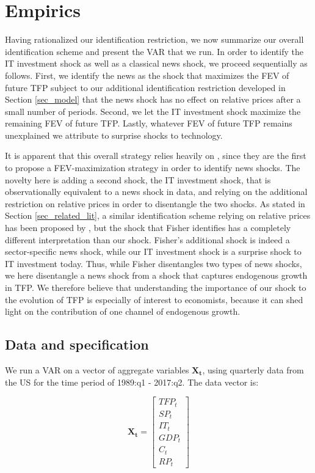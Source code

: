 \documentclass[11pt]{article}
\renewcommand{\[}{\begin{equation}}
\renewcommand{\]}{\end{equation}}
\begin{document}
\section{Empirics}
\label{sec_empirics}
Having rationalized our identification restriction, we now summarize our overall identification scheme and present the VAR that we run. In order to identify the IT investment shock as well as a classical news shock, we proceed sequentially as follows. First, we identify the news as the shock that maximizes the FEV of future TFP subject to our additional identification restriction developed in Section \ref{sec_model} that the news shock has no effect on relative prices after a small number of periods. Second, we let the IT investment shock maximize the remaining FEV of future TFP. Lastly, whatever FEV of future TFP remains unexplained we attribute to surprise shocks to technology. 

It is apparent that this overall strategy relies heavily on \cite{barsky_sims2011}, since they are the first to propose a FEV-maximization strategy in order to identify news shocks. The novelty here is adding a second shock, the IT investment shock, that is observationally equivalent to a news shock in data, and relying on the additional restriction on relative prices in order to disentangle the two shocks. As stated in Section \ref{sec_related_lit}, a similar identification scheme relying on relative prices has been proposed by \cite{fisher2006}, but the shock that Fisher identifies has a completely different interpretation than our shock. Fisher's additional shock is indeed a sector-specific news shock, while our IT investment shock is a surprise shock to IT investment today. Thus, while Fisher disentangles two types of news shocks, we here disentangle a news shock from a shock that captures endogenous growth in TFP. We therefore believe that understanding the importance of our shock to the evolution of TFP is especially of interest to economists, because it can shed light on the contribution of one channel of endogenous growth. 

\subsection{Data and specification}
We run a VAR on a vector of aggregate variables $\mathbf{X_t}$, using quarterly data from the US for the time period of 1989:q1 - 2017:q2. The data vector is:

	\begin{equation*}
	\mathbf{X_t} = 
	\begin{bmatrix}
    TFP_t      \\
 
   SP_t   \\
   
   IT_t \\
   
   GDP_t \\
   
   C_t \\
   
   RP_t
\end{bmatrix}
	\end{equation*}
	
\end{document}
